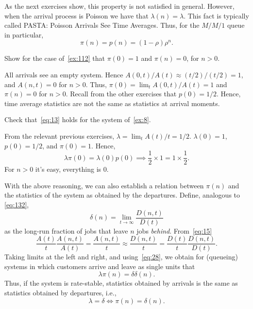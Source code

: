 As the next exercises show, this property is not satisfied in general.
However, when the arrival process is Poisson we have that $\lambda(n)=\lambda$.
This fact is typically called PASTA: Poisson Arrivals See Time Averages.
Thus, for the $M/M/1$ queue in particular,
\begin{equation*}
  \pi(n) = p(n) = (1-\rho)\rho^n.
\end{equation*}

\begin{exercise}\label{ex:8} Show for the case of~\cref{ex:112} that $\pi(0)=1$ and $\pi(n)=0$, for $n>0$.
\begin{solution}
  All arrivals see an empty system. Hence $A(0,t)/A(t) \approx (t/2)/(t/2) = 1$, and $A(n,t)=0$ for $n>0$. Thus, $\pi(0) = \lim_t A(0,t)/A(t) = 1$ and $\pi(n)=0$ for $n>0$. Recall from the other exercises that $p(0)=1/2$. Hence, time average statistics are not the same as statistics at arrival moments. 
\end{solution}

\end{exercise}

\begin{exercise}
  Check that~\cref{eq:13}  holds for the system of~\cref{ex:8}.
  \begin{solution}
From the relevant previous exercises, $\lambda = \lim_t A(t)/t = 1/2$. $\lambda(0)=1$, $p(0)=1/2$, and $\pi(0)=1$. Hence,
\begin{equation*}
  \lambda \pi(0) = \lambda(0) p(0) \implies  \frac 1 2 \times 1 = 1\times \frac 1 2.
\end{equation*}
For $n>0$ it's easy, everything is 0.
  \end{solution}
\end{exercise}





With the above reasoning, we can also establish a relation between $\pi(n)$ and the statistics of the system as obtained by the departures.
Define, analogous to \cref{eq:132}, 
\begin{equation}
  \label{eq:33}
  \delta(n) = \lim_{t\to\infty} \frac{D(n,t)}{D(t)}
\end{equation}
as the long-run fraction of jobs that leave $n$ jobs \emph{behind}.
From~\cref{eq:15}
\begin{equation*}
\frac{A(t)}t \frac{A(n,t)}{A(t)} = \frac{A(n,t)}t \approx \frac{D(n,t)}t 
= \frac{D(t)}t \frac{D(n,t)}{D(t)}.
\end{equation*}
Taking limits at the left and right, and using~\cref{eq:28}, we obtain for (queueing) systems in which customers arrive and leave as single units that
\begin{equation}
  \label{eq:36}
  \lambda \pi(n) = \delta \delta(n).
\end{equation}
Thus, if the system is rate-stable, statistics obtained  by arrivals is the same as statistics obtained by departures, i.e., 
\begin{equation}
  \label{eq:39}
\lambda = \delta \iff  \pi(n) = \delta(n).
\end{equation}


